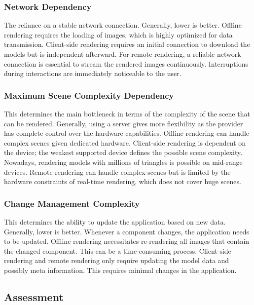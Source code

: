 \subsubsection{Network Dependency}

The reliance on a stable network connection. Generally, lower is better. Offline rendering requires the loading of images, which is highly optimized for data transmission. Client-side rendering requires an initial connection to download the models but is independent afterward. For remote rendering, a reliable network connection is essential to stream the rendered images continuously. Interruptions during interactions are immediately noticeable to the user.

\subsubsection{Maximum Scene Complexity Dependency}

This determines the main bottleneck in terms of the complexity of the scene that can be rendered. Generally, using a server gives more flexibility as the provider has complete control over the hardware capabilities. Offline rendering can handle complex scenes given dedicated hardware. Client-side rendering is dependent on the device; the weakest supported device defines the possible scene complexity. Nowadays, rendering models with millions of triangles is possible on mid-range devices. Remote rendering can handle complex scenes but is limited by the hardware constraints of real-time rendering, which does not cover huge scenes.

\subsubsection{Change Management Complexity}

This determines the ability to update the application based on new data. Generally, lower is better. Whenever a component changes, the application needs to be updated. Offline rendering necessitates re-rendering all images that contain the changed component. This can be a time-consuming process. Client-side rendering and remote rendering only require updating the model data and possibly meta information. This requires minimal changes in the application.

\subsection*{Assessment}
\label{ch:paradigmAssessment}

